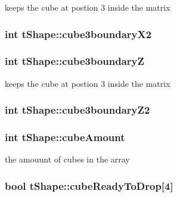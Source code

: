 keeps the cube at postion 3 inside the matrix \hypertarget{classt_shape_a4c6aff9cf7e8fcc0b0fa8d8a0312f83c}{
\subsubsection[{cube3boundary\-X2}]{\setlength{\rightskip}{0pt plus 5cm}int t\-Shape\-::cube3boundary\-X2}}\label{classt_shape_a4c6aff9cf7e8fcc0b0fa8d8a0312f83c}
\hypertarget{classt_shape_a08534f9b32ceebaa5ca648d30a003d6f}{
\subsubsection[{cube3boundary\-Z}]{\setlength{\rightskip}{0pt plus 5cm}int t\-Shape\-::cube3boundary\-Z}}\label{classt_shape_a08534f9b32ceebaa5ca648d30a003d6f}
keeps the cube at postion 3 inside the matrix \hypertarget{classt_shape_ac0932463ccf31060b93109584e7b142c}{
\subsubsection[{cube3boundary\-Z2}]{\setlength{\rightskip}{0pt plus 5cm}int t\-Shape\-::cube3boundary\-Z2}}\label{classt_shape_ac0932463ccf31060b93109584e7b142c}
\hypertarget{classt_shape_a39a906a952b50e774dd199829763ce1f}{
\subsubsection[{cube\-Amount}]{\setlength{\rightskip}{0pt plus 5cm}int t\-Shape\-::cube\-Amount}}\label{classt_shape_a39a906a952b50e774dd199829763ce1f}
the amouunt of cubes in the array \hypertarget{classt_shape_a373d44cd6129f88aded56fd7a7ea7e43}{
\subsubsection[{cube\-Ready\-To\-Drop}]{\setlength{\rightskip}{0pt plus 5cm}bool t\-Shape\-::cube\-Ready\-To\-Drop\mbox{[}4\mbox{]}}}\label{classt_shape_a373d44cd6129f88aded56fd7a7ea7e43}
